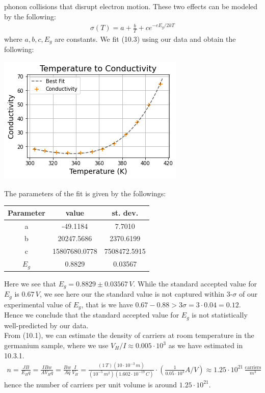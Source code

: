 \documentclass[11pt]{book}
\theoremstyle{break}
\theoremstyle{break}
\begin{document}
phonon collisions that disrupt electron motion. These two effects can be modeled by the following:
\begin{align}
\sigma(T) = a+\frac{b}{T}+ce^{-eE_g/2kT}
\end{align}
where $a,b,c,E_g$ are constants. We fit (10.3) using our data and obtain the following:
\begin{center}
\includegraphics[scale=0.6]{5}
\end{center}
The parameters of the fit is given by the followings:
\begin{center}
\begin{tabular}{|c|c|c|}
\hline
Parameter & value & st. dev.\\
\hline
a& -49.1184 & 7.7010 \\
\hline
b & 20247.5686 & 2370.6199\\
\hline
c & 15807680.0778 & 7508472.5915 \\
\hline
$E_g$& 0.8829 & 0.03567\\
\hline
\end{tabular}
\end{center}
Here we see that $E_g = 0.8829 \pm 0.03567\, V$. While the standard accepted value for $E_g$ is $0.67\, V$, we see here our the standard value is not captured within $3$-$\sigma$ of our experimental value of $E_g$, that is we have $0.67 - 0.88 > 3\sigma = 3\cdot 0.04 = 0.12$. Hence we conclude that the standard accepted value for $E_g$ is not statistically well-predicted by our data.\\


From (10.1), we can estimate the density of carriers at room temperature in the germanium sample, where we use $V_H/I \approx 0.005\cdot 10^{3}$ as we have estimated in 10.3.1. 
\begin{align*}
n = \frac{JB}{E_Hq} = \frac{IBw}{AV_Hq}=\frac{Bw}{Aq}\frac{I}{V_H} = \frac{(1\,T)(10\cdot 10^{-3}\, m)}{(10^{-5}\, m^2)(1.602\cdot 10^{-19}\, C)}\cdot \left(\frac{1}{0.05\cdot 10^3} A/V\right) \approx 1.25\cdot 10^{21}\, \frac{\text{carriers}}{m^3}
\end{align*}
hence the number of carriers per unit volume is around $1.25\cdot 10^{21}$. \\
\end{document}
